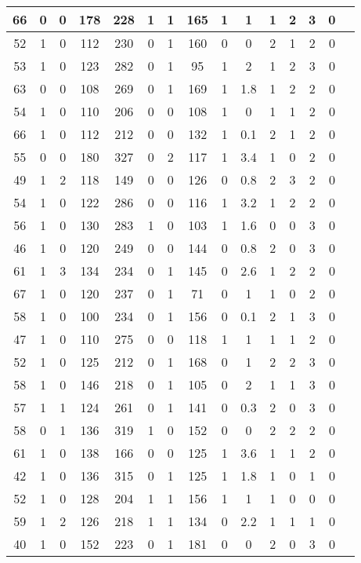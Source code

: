 \documentclass{article}
\begin{document}
\begin{longtable}{
|
c|c|c|c|c|c|c|c|c|c|c|c|c|c|c|}
\hline
66 & 0 & 0 & 178 & 228 & 1 & 1 & 165 & 1 & 1 & 1 & 2 & 3 & 0 \\
\hline
52 & 1 & 0 & 112 & 230 & 0 & 1 & 160 & 0 & 0 & 2 & 1 & 2 & 0 \\
\hline
53 & 1 & 0 & 123 & 282 & 0 & 1 & 95 & 1 & 2 & 1 & 2 & 3 & 0 \\
\hline
63 & 0 & 0 & 108 & 269 & 0 & 1 & 169 & 1 & 1.8 & 1 & 2 & 2 & 0 \\
\hline
54 & 1 & 0 & 110 & 206 & 0 & 0 & 108 & 1 & 0 & 1 & 1 & 2 & 0 \\
\hline
66 & 1 & 0 & 112 & 212 & 0 & 0 & 132 & 1 & 0.1 & 2 & 1 & 2 & 0 \\
\hline
55 & 0 & 0 & 180 & 327 & 0 & 2 & 117 & 1 & 3.4 & 1 & 0 & 2 & 0 \\
\hline
49 & 1 & 2 & 118 & 149 & 0 & 0 & 126 & 0 & 0.8 & 2 & 3 & 2 & 0 \\
\hline
54 & 1 & 0 & 122 & 286 & 0 & 0 & 116 & 1 & 3.2 & 1 & 2 & 2 & 0 \\
\hline
56 & 1 & 0 & 130 & 283 & 1 & 0 & 103 & 1 & 1.6 & 0 & 0 & 3 & 0 \\
\hline
46 & 1 & 0 & 120 & 249 & 0 & 0 & 144 & 0 & 0.8 & 2 & 0 & 3 & 0 \\
\hline
61 & 1 & 3 & 134 & 234 & 0 & 1 & 145 & 0 & 2.6 & 1 & 2 & 2 & 0 \\
\hline
67 & 1 & 0 & 120 & 237 & 0 & 1 & 71 & 0 & 1 & 1 & 0 & 2 & 0 \\
\hline
58 & 1 & 0 & 100 & 234 & 0 & 1 & 156 & 0 & 0.1 & 2 & 1 & 3 & 0 \\
\hline
47 & 1 & 0 & 110 & 275 & 0 & 0 & 118 & 1 & 1 & 1 & 1 & 2 & 0 \\
\hline
52 & 1 & 0 & 125 & 212 & 0 & 1 & 168 & 0 & 1 & 2 & 2 & 3 & 0 \\
\hline
58 & 1 & 0 & 146 & 218 & 0 & 1 & 105 & 0 & 2 & 1 & 1 & 3 & 0 \\
\hline
57 & 1 & 1 & 124 & 261 & 0 & 1 & 141 & 0 & 0.3 & 2 & 0 & 3 & 0 \\
\hline
58 & 0 & 1 & 136 & 319 & 1 & 0 & 152 & 0 & 0 & 2 & 2 & 2 & 0 \\
\hline
61 & 1 & 0 & 138 & 166 & 0 & 0 & 125 & 1 & 3.6 & 1 & 1 & 2 & 0 \\
\hline
42 & 1 & 0 & 136 & 315 & 0 & 1 & 125 & 1 & 1.8 & 1 & 0 & 1 & 0 \\
\hline
52 & 1 & 0 & 128 & 204 & 1 & 1 & 156 & 1 & 1 & 1 & 0 & 0 & 0 \\
\hline
59 & 1 & 2 & 126 & 218 & 1 & 1 & 134 & 0 & 2.2 & 1 & 1 & 1 & 0 \\
\hline
40 & 1 & 0 & 152 & 223 & 0 & 1 & 181 & 0 & 0 & 2 & 0 & 3 & 0 \\

\end{longtable}
\end{document}
